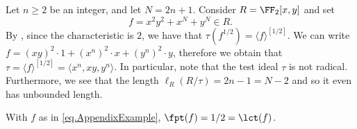 \documentclass[11pt]{amsart}
\begin{document}
Let $n {\geqslant} 2$ be an integer, and let $N=2n+1$. Consider $R=\FF_2[x,y]$ and set \begin{equation}
\label{eq.AppendixExample}
f=x^2y^2+x^N+y^N \in R.
\end{equation}
By \cite{BlickleMustataSmithDiscretenessAndRationalityOfFThresholds}, since the characteristic is $2$, we have that $\tau(f^{1/2}) = \langle f \rangle^{[1/2]}$.  We can write $f=(xy)^2 \cdot 1 + (x^n)^2\cdot x + (y^n)^2 \cdot y$, therefore we obtain that $\tau = \langle f\rangle^{[1/2]} = \langle x^n,xy,y^n\rangle$.  In particular, note that the test ideal $\tau$ is not radical.  Furthermore, we see that the length $\ell_R(R/\tau) = 2n - 1 = N - 2$ and so it even has unbounded length.

\begin{proposition} \label{ex_lct=fpt} With $f$ as in \eqref{eq.AppendixExample}, $\fpt(f) = 1/2 = \lct(f)$.
\end{proposition}
\end{document}
